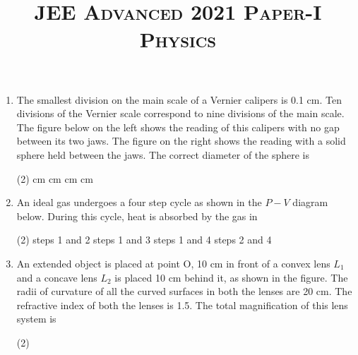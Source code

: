 \documentclass{article}
\title{\textsc{JEE Advanced 2021 Paper-I\\Physics}}
\date{}
\begin{document}
\maketitle


\begin{enumerate}
    \item The smallest division on the main scale of a Vernier calipers is 0.1 cm. Ten divisions of the Vernier scale correspond to nine divisions of the main scale. The figure below on the left shows the reading of this calipers with no gap between its two jaws. The figure on the right shows the reading with a solid sphere held between the jaws. The correct diameter of the sphere is
    \begin{center}
        \end{center}
        \begin{tasks}(2)
            	 cm
            	 cm
            	 cm
            	 cm
        \end{tasks}
    \item An ideal gas undergoes a four step cycle as shown in the \(P - V\) diagram below. During this cycle, heat is absorbed by the gas in
    \begin{center}
        \end{center}
        \begin{tasks}(2)
            	\task steps 1 and 2
            	\task steps 1 and 3
            	\task steps 1 and 4
            	\task steps 2 and 4
        \end{tasks}

    \item An extended object is placed at point O, 10 cm in front of a convex lens \(L_1\) and a concave lens \(L_2\) is placed 10 cm behind it, as shown in the figure. The radii of curvature of all the curved surfaces in both the lenses are 20 cm. The refractive index of both the lenses is 1.5. The total magnification of this lens system is
    \begin{center}
    \end{center}
        \begin{tasks}(2)
        \end{tasks}
        

\end{enumerate}
\end{document}

